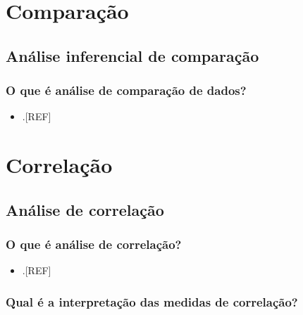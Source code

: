\documentclass[
  a4paper,
]{book}
\providecommand{\tightlist}{%
  \setlength{\itemsep}{0pt}\setlength{\parskip}{0pt}}
\begin{document}
\hypertarget{analise-comparacao}{%
\chapter{\texorpdfstring{\textbf{Comparação}}{Comparação}}\label{analise-comparacao}}

\hypertarget{analise-inferencial-comparacao}{%
\section{Análise inferencial de comparação}\label{analise-inferencial-comparacao}}

\hypertarget{o-que-uxe9-anuxe1lise-de-comparauxe7uxe3o-de-dados}{%
\subsection{O que é análise de comparação de dados?}\label{o-que-uxe9-anuxe1lise-de-comparauxe7uxe3o-de-dados}}

\begin{itemize}
\tightlist
\item
  .{[}REF{]}
\end{itemize}

\hypertarget{analise-inferencial-correlacao}{%
\chapter{\texorpdfstring{\textbf{Correlação}}{Correlação}}\label{analise-inferencial-correlacao}}

\hypertarget{analise-correlacao}{%
\section{Análise de correlação}\label{analise-correlacao}}

\hypertarget{o-que-uxe9-anuxe1lise-de-correlauxe7uxe3o}{%
\subsection{O que é análise de correlação?}\label{o-que-uxe9-anuxe1lise-de-correlauxe7uxe3o}}

\begin{itemize}
\tightlist
\item
  .{[}REF{]}
\end{itemize}

\hypertarget{qual-uxe9-a-interpretauxe7uxe3o-das-medidas-de-correlauxe7uxe3o}{%
\subsection{Qual é a interpretação das medidas de correlação?}\label{qual-uxe9-a-interpretauxe7uxe3o-das-medidas-de-correlauxe7uxe3o}}
\end{document}
